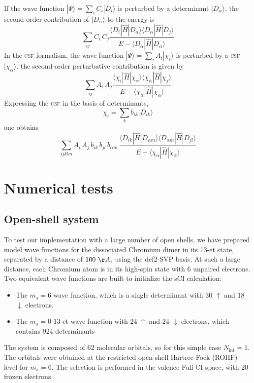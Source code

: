 \documentclass[aip,jcp,reprint,showkeys]{revtex4-1}
\newcommand{\ket}[1]{|#1\rangle}
\newcommand{\up}{\uparrow}
\newcommand{\dn}{\downarrow}
\newcommand{\Nint}{{N_\text{int}}}
\newcommand{\csf}{\textsc{csf}}
\newcommand{\mel}[3]{\langle #1 | #2 | #3 \rangle}
\begin{document}
If the wave function $\ket{\Psi} = \sum_i C_i \ket{D_i}$ is perturbed by a
determinant $\ket{D_\alpha}$, the second-order contribution of $\ket{D_\alpha}$
to the energy is 
\begin{equation}
\sum_{ij} C_i\, C_j
  \frac{
    \mel{D_i}{\hat{H}}{D_\alpha}\mel{D_\alpha}{\hat{H}}{D_j}
}{
    E-\mel{D_\alpha}{\hat{H}}{D_\alpha}
}
\label{eq:pt2det}
\end{equation}
In the \csf{} formalism, the wave function $\ket{\Psi} = \sum_i A_i
\ket{\chi_i}$ is perturbed by a \csf{} $\ket{\chi_\alpha}$.
the second-order perturbative contribution is given by
\begin{equation}
\sum_{ij} A_i\, A_j
  \frac{
    \mel{\chi_i}{\hat{H}}{\chi_\alpha}\mel{\chi_\alpha}{\hat{H}}{\chi_j}
}{
    E-\mel{\chi_\alpha}{\hat{H}}{\chi_\alpha}
}
\label{eq:pt2csf}
\end{equation}
Expressing the \csf{} in the basis of determinants,
\begin{equation}
\chi_i = \sum_k b_{ik} \ket{D_{ik}}
\end{equation}
one obtains
\begin{equation}
\sum_{ijklm} A_i\, A_j\, b_{ik}\, b_{jl}\, b_{\alpha m}\,
  \frac{
    \mel{D_{ik}}{\hat{H}}{D_{\alpha m}}\mel{D_{\alpha m}}{\hat{H}}{D_{jl}}
}{
    E-\mel{\chi_\alpha}{\hat{H}}{\chi_\alpha}
}
\label{eq:pt2csf}
\end{equation}



\section{Numerical tests}


\subsection{Open-shell system}

To test our implementation with a large number of open shells, we have prepared
model wave functions for the dissociated Chromium dimer in its 13-et state, separated by a
distance of $100~\AA$, using the def2-SVP basis.\cite{Weigend_2005}
At such a large distance, each Chromium atom is in its high-spin state with $6$
unpaired electrons. Two equivalent wave functions are built to initialize the sCI
calculation:
\begin{itemize}
\item The $m_s=6$ wave function, which is a single determinant with $30$ $\up$
      and $18$ $\dn$ electrons.
\item The $m_s=0$ 13-et wave function with $24$ $\up$ and $24$ $\dn$ electrons, which
      contains 924 determinants
\end{itemize}
The system is composed of $62$ molecular orbitals, so for this simple case $\Nint=1$.
The orbitals were obtained at the restricted open-shell Hartree-Fock (ROHF) level
for $m_s=6$.
The selection is performed in the valence Full-CI space, with $20$ frozen electrons.
\end{document}
